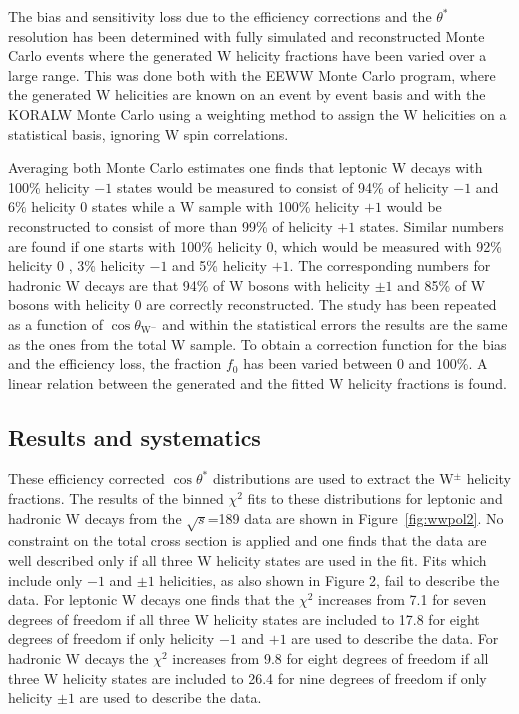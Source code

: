 \documentclass[12pt,a4paper,dvips]{article}
\begin{document}
The bias and sensitivity loss due to the efficiency corrections and 
the $\theta^{*}$ resolution has been determined 
with fully simulated and reconstructed Monte Carlo events where
the generated W helicity fractions have been varied over a large range.
This was done both with the EEWW Monte Carlo program, where
the generated W helicities are known on an event 
by event basis and with the KORALW Monte Carlo using 
a weighting method to assign the W helicities on a 
statistical basis, ignoring W spin correlations.

Averaging both Monte Carlo estimates   
one finds that leptonic W decays with 100\% helicity $-1$ states would 
be measured to consist of 94\% of helicity $-1$ and 6\% helicity $0$ 
states while a W sample with 100\% helicity $+1$
would be reconstructed to consist of more than 99\% of 
helicity $+1$ states.
Similar numbers are found if one starts with 100\% helicity $0$, which 
would be measured with 92\% helicity $0$ , 3\% helicity $-1$ 
and 5\% helicity $+1$.
The corresponding numbers for hadronic W decays are that 94\% of W bosons 
with helicity $\pm 1$ and 85\% of W bosons with helicity $0$ are correctly 
reconstructed. The study has been repeated 
as a function of $\cos \theta_{\mathrm{W}^{-}}$ and 
within the statistical errors the 
results are the same as the ones from the total W sample.
To obtain a correction function for the bias and the 
efficiency loss, the fraction $f_{0}$ 
has been varied between 0 and 100\%. 
A linear relation between the generated and the fitted W 
helicity fractions is found. 

\subsection*{Results and systematics}

These efficiency corrected   
$\cos \theta^{*}$ distributions are used to extract 
the W$^{\pm}$ helicity fractions.
The results of the binned $\chi^{2}$ fits to these distributions for 
leptonic and hadronic W decays from 
the $\sqrt{s}$=189 \GeV{} data 
are shown in Figure~\ref{fig:wwpol2}. No constraint on the total 
cross section is applied and one finds that 
the data are well described 
only if all three W helicity states are used in the fit.  
Fits which include only 
$-1$ and $\pm 1$ helicities, as also shown 
in Figure 2, fail to describe the data.
For leptonic W decays one finds that 
the $\chi^{2}$ increases from 7.1 for seven degrees of freedom 
if all three W helicity states
are included to 17.8 for eight degrees of freedom
if only helicity $-1$ and $+1$ are used to describe the data.
For hadronic W decays the 
$\chi^{2}$ increases from 9.8 for eight degrees of freedom 
if all three W helicity states are included to 26.4 for 
nine degrees of freedom
if only helicity $\pm 1$ are used to describe the data. 
\end{document}
